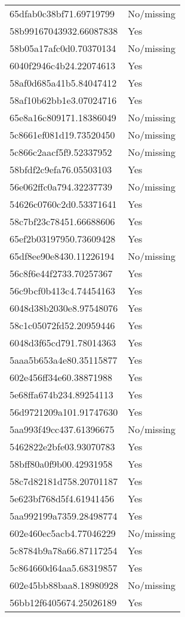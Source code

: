 \begin{tabular}{ll}
65dfab0c38bf71.69719799 & No/missing \\
58b99167043932.66087838 & Yes \\
58b05a17afc0d0.70370134 & No/missing \\
6040f2946c4b24.22074613 & Yes \\
58af0d685a41b5.84047412 & Yes \\
58af10b62bb1e3.07024716 & Yes \\
65e8a16c809171.18386049 & No/missing \\
5c8661ef081d19.73520450 & No/missing \\
5c866c2aacf5f9.52337952 & No/missing \\
58bfdf2c9efa76.05503103 & Yes \\
56e062ffc0a794.32237739 & No/missing \\
54626c0760c2d0.53371641 & Yes \\
58c7bf23c78451.66688606 & Yes \\
65ef2b03197950.73609428 & Yes \\
65df8ee90e8430.11226194 & No/missing \\
56c8f6e44f2733.70257367 & Yes \\
56c9bcf0b413c4.74454163 & Yes \\
6048d38b2030e8.97548076 & Yes \\
58c1c05072fd52.20959446 & Yes \\
6048d3f65cd791.78014363 & Yes \\
5aaa5b653a4e80.35115877 & Yes \\
602e456ff34e60.38871988 & Yes \\
5e68ffa674b234.89254113 & Yes \\
56d9721209a101.91747630 & Yes \\
5aa993f49cc437.61396675 & No/missing \\
5462822e2bfe03.93070783 & Yes \\
58bff80a0f9b00.42931958 & Yes \\
58c7d82181d758.20701187 & Yes \\
5e623bf768d5f4.61941456 & Yes \\
5aa992199a7359.28498774 & Yes \\
602e460ec5acb4.77046229 & No/missing \\
5c8784b9a78a66.87117254 & Yes \\
5c864660d64aa5.68319857 & Yes \\
602e45bb88baa8.18980928 & No/missing \\
56bb12f6405674.25026189 & Yes \\

\end{tabular}
